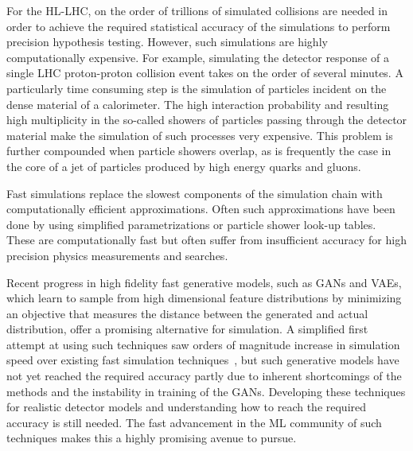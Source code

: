 For the HL-LHC, on the order of trillions of simulated collisions are needed in order to achieve the required statistical accuracy of the simulations to perform precision hypothesis testing. However, such simulations are highly computationally expensive. For example, simulating the detector response of  a single LHC proton-proton collision event takes on the order of several minutes. A particularly time consuming step is the simulation of particles incident on the dense material of a calorimeter. %
The high interaction probability and resulting high multiplicity in the so-called showers of particles passing through the detector material make the simulation of such processes very expensive. This problem is further compounded when particle showers overlap, as is frequently the case in the core of a jet of particles produced by high energy quarks and gluons.


Fast simulations replace the slowest components of the simulation chain with computationally efficient approximations. Often such approximations have been done by using simplified parametrizations or particle shower look-up tables. These are computationally fast but often suffer from insufficient accuracy for high precision physics measurements and searches.

Recent progress in high fidelity fast generative models, such as GANs and VAEs, which learn to sample from high dimensional feature distributions by minimizing an objective that measures the distance between the generated and actual distribution, offer a promising alternative for simulation.
%
A simplified first attempt at using such techniques saw orders of magnitude increase in simulation speed over existing fast simulation techniques~\cite{Paganini:2017hrr}, but such generative models have not yet reached the required accuracy partly due to inherent shortcomings of the methods and the instability in training of the GANs.  Developing these techniques for realistic detector models and understanding how to reach the required accuracy is still needed. The fast advancement in the ML community of such techniques makes this a highly promising avenue to pursue.

